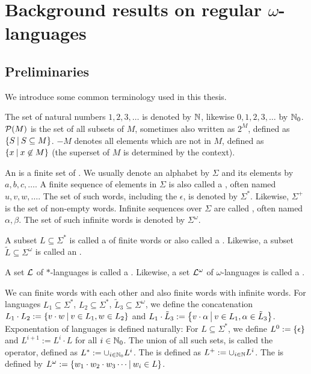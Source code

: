 \section{Background results on regular $\omega$-languages}
\label{chapter:regOmegaLangs}

\subsection{Preliminaries}
We introduce some common terminology used in this thesis.

The set of natural numbers $1,2,3,\dots$ is denoted by $\mathbb{N}$, likewise $0,1,2,3,\dots$ by $\mathbb{N}_0$. $\mathcal{P}(M)$ is the set of all subsets of $M$, sometimes also written as $2^M$, defined as $\Set{S}{S \subseteq M}$. $-M$ denotes all elements which are not in $M$, defined as $\Set{x}{x \not\in M}$ (the superset of $M$ is determined by the context).

An  is a finite set of . We usually denote an alphabet by $\Sigma$ and its elements by $a, b, c, \dots$. A finite sequence of elements in $\Sigma$ is also called a , often named $u, v, w, \dots$. The set of such words, including the  $\epsilon$, is denoted by $\Sigma^*$. Likewise, $\Sigma^+$ is the set of non-empty words. Infinite sequences over $\Sigma$ are called , often named $\alpha, \beta$. The set of such infinite words is denoted by $\Sigma^\omega$.

A subset $L \subseteq \Sigma^*$ is called a  of finite words or also called a . Likewise, a subset $\tilde L \subseteq \Sigma^\omega$ is called an .

A set $\mathcal{L}$ of $*$-languages is called a . Likewise, a set $\mathcal{L}^\omega$ of $\omega$-languages is called a .

We can  finite words with each other and also finite words with infinite words. For languages $L_1 \subseteq \Sigma^*$, $L_2 \subseteq \Sigma^*$, $\tilde L_3 \subseteq \Sigma^\omega$, we define the concatenation $L_1 \cdot L_2 := \Set{v \cdot w}{v \in L_1, w \in L_2}$ and $L_1 \cdot \tilde L_3 := \Set{v \cdot \alpha}{v \in L_1, \alpha \in \tilde L_3}$. Exponentation of languages is defined naturally: For $L \subseteq \Sigma^*$, we define $L^0 := \Set{\epsilon}$ and $L^{i+1} := L^i \cdot L$ for all $i \in \mathbb{N}_0$. The union of all such sets, is called the  operator, defined as $L^* := \cup_{i\in\mathbb{N}_0} L^i$. The  is defined as $L^+ := \cup_{i\in\mathbb{N}} L^i$. The  is defined by $L^\omega := \Set{w_1 \cdot w_2 \cdot w_3 \cdots}{w_i \in L}$.

